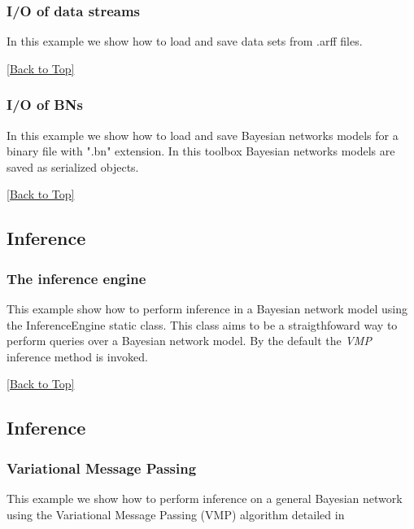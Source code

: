 \documentclass[10pt,a4paper]{article}
\begin{document}
\subsubsection{I/O of data streams}\label{sec:bns:io:iods}
In this example we show how to load and save data sets from .arff files.

\hyperref[sec:bns]{[Back to Top]}\newline 

\subsubsection{I/O of BNs}\label{sec:bns:io:iobn}
In this example we show how to load and save Bayesian networks models for a binary file with ".bn" extension. In this toolbox Bayesian networks models are saved as serialized objects.

\hyperref[sec:bns]{[Back to Top]}\newline 


\subsection{Inference}\label{sec:bns:inference}

\subsubsection{The inference engine}\label{sec:bns:inference:engine}
This example show how to perform inference in a Bayesian network model using the InferenceEngine static class. This class aims to be a straigthfoward way to perform queries over a Bayesian network model. By the default the \textit{VMP} inference method is invoked.

\hyperref[sec:bns]{[Back to Top]}\newline 


\subsection{Inference}\label{sec:bns:inference}

\subsubsection{Variational Message Passing}\label{sec:bns:inference:vmp}
This example we show how to perform inference on a general Bayesian network using the Variational Message Passing (VMP) algorithm detailed in
\end{document}
